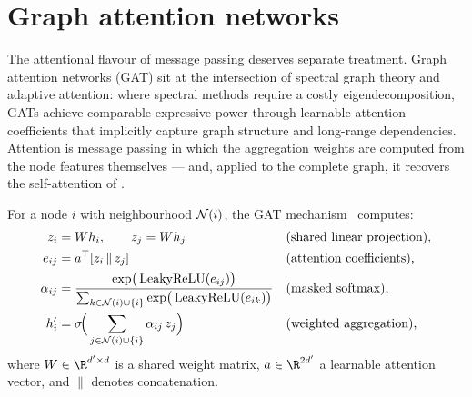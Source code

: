 \section{Graph attention networks}
\label{sec:graphs:gat}

The attentional flavour of message passing deserves separate treatment. Graph
attention networks (GAT) sit at the intersection of spectral graph theory and
adaptive attention: where spectral methods require a costly eigendecomposition,
GATs achieve comparable expressive power through learnable attention coefficients
that implicitly capture graph structure and long-range dependencies. Attention is
message passing in which the aggregation weights are computed from the node
features themselves --- and, applied to the complete graph, it recovers the
self-attention of .

\begin{definition}
\label{def:graphs:gat}
For a node $i$ with neighbourhood $\mathcal{N}(i)$, the GAT
mechanism~\citep{velickovic2017graph} computes:
\begin{align}
  z_i &= W h_i, \qquad z_j = W h_j
    && \text{(shared linear projection),} \\
  e_{ij} &= a^\top [z_i \,\|\, z_j]
    && \text{(attention coefficients),} \\
  \alpha_{ij} &= \frac{\exp\!\big(\operatorname{LeakyReLU}(e_{ij})\big)}
       {\sum_{k \in \mathcal{N}(i) \cup \{i\}} \exp\!\big(\operatorname{LeakyReLU}(e_{ik})\big)}
    && \text{(masked softmax),} \\
  h_i' &= \sigma\!\Big(\sum_{j \in \mathcal{N}(i) \cup \{i\}} \alpha_{ij}\, z_j\Big)
    && \text{(weighted aggregation),}
\end{align}
where $W \in \R^{d' \times d}$ is a shared weight matrix, $a \in \R^{2d'}$ a
learnable attention vector, and $\|$ denotes concatenation.
\end{definition}

